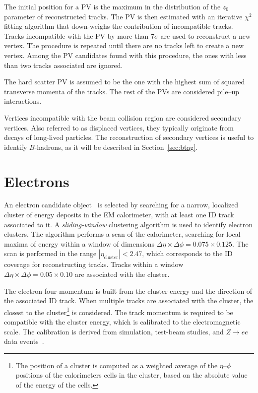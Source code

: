 The initial position for a PV is the maximum in the distribution of
the $z_0$ parameter of reconstructed tracks. The PV is then
estimated with an iterative $\chi^2$ fitting algorithm that
down-weighs the contribution of incompatible tracks. Tracks
incompatible with the PV by more than 7$\sigma$ are used to
reconstruct a new vertex. The procedure is repeated until there are no
tracks left to create a new vertex. Among the PV candidates found with
this procedure, the ones with less than two tracks associated are ignored. 

The hard scatter PV is assumed to be the one with the highest sum of
squared transverse momenta of the tracks. The rest of the PVs are
considered pile--up interactions. 

Vertices incompatible with the beam collision region are considered
secondary vertices.
Also referred to as displaced vertices, they typically originate from
decays of long-lived particles.
The reconstruction of secondary vertices is useful to identify
$B$-hadrons, as it will be described in Section~\ref{sec:btag}.

\section{Electrons}
\label{sec:electrons}

An electron candidate object~\cite{elereco} is selected by searching 
for a narrow, 
localized cluster of energy deposits in the EM calorimeter, 
with at least one ID track associated to it.
A {\it sliding-window} clustering algorithm is used to identify electron 
clusters. The algorithm performs a scan of the calorimeter, searching 
for local maxima of energy within a window of dimensions
$\Delta\eta\times\Delta\phi=0.075\times{}0.125$. 
The scan is performed in the range $|\eta_{\mathrm{cluster}}|<2.47$, 
which corresponds to the ID coverage for reconstructing tracks. 
Tracks within a window $\Delta\eta\times\Delta\phi=0.05\times{}0.10$
are associated with the cluster.

The electron four-momentum is built from the cluster energy
and the direction of the associated ID track.
When multiple tracks are associated with the cluster, the closest
to the cluster\footnote{The position of a cluster 
is computed as a weighted average of the $\eta$--$\phi$ positions 
of the calorimeters cells in the cluster, based on the absolute 
value of the energy of the cells.} is considered.
The track momentum is required to be compatible with the cluster energy,
which is calibrated to the electromagnetic scale. The calibration is
derived from simulation, test-beam studies, and $Z\to ee$ data 
events~\cite{elecalib}.


